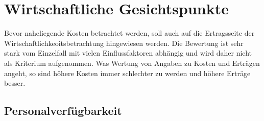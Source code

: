 




\section{Wirtschaftliche Gesichtspunkte}\label{krit:oeconomics}

Bevor naheliegende Kosten betrachtet werden, soll auch auf die Ertragsseite der Wirtschaftlichkeoitsbetrachtung hingewiesen werden.
Die Bewertung ist sehr stark vom Einzelfall mit vielen Einflussfaktoren 
abhängig und wird daher nicht als Kriterium aufgenommen.
Was Wertung von Angaben zu Kosten und Erträgen angeht, so sind höhere Kosten immer schlechter zu werden und höhere Erträge besser.

\subsection{Personalverfügbarkeit}\label{krit:personal}

